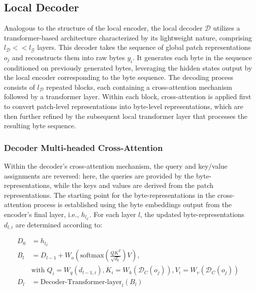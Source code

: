 \subsection{Local Decoder} 

Analogous to the structure of the local encoder, the local decoder $\mathcal{D}$ utilizes a transformer-based architecture characterized by its lightweight nature, comprising $l_{\mathcal{D}} << l_{\mathcal{G}}$ layers. This decoder takes the sequence of global patch representations $o_j$ and reconstructs them into raw bytes $y_i$. It generates each byte in the sequence conditioned on previously generated bytes, leveraging the hidden states output by the local encoder corresponding to the byte sequence. The decoding process consists of $l_{\mathcal{D}}$ repeated blocks, each containing a cross-attention mechanism followed by a transformer layer. Within each block, cross-attention is applied first to convert patch-level representations into byte-level representations, which are then further refined by the subsequent local transformer layer that processes the resulting byte sequence.

\subsubsection{Decoder Multi-headed Cross-Attention} 

Within the decoder’s cross-attention mechanism, the query and key/value assignments are reversed: here, the queries are provided by the byte-representations, while the keys and values are derived from the patch representations. The starting point for the byte-representations in the cross-attention process is established using the byte embeddings output from the encoder’s final layer, i.e., $h_{l_{\mathcal{E}}}$. For each layer $l$, the updated byte-representations $d_{l,i}$ are determined according to:

\begin{align}
D_0 &= h_{l_{\mathcal{E}}} \\
B_l &= D_{l-1} + W_o\left(\text{softmax}\left(\frac{QK^T}{\sqrt{d_k}}\right)V\right), \\
  &\text{with } Q_i = W_q(d_{l-1,i}), K_i = W_k(\mathcal{D}_C(o_j)), V_i = W_v(\mathcal{D}_C(o_j)) \\
  D_l &= \text{Decoder-Transformer-layer}_l(B_l)
\end{align}

